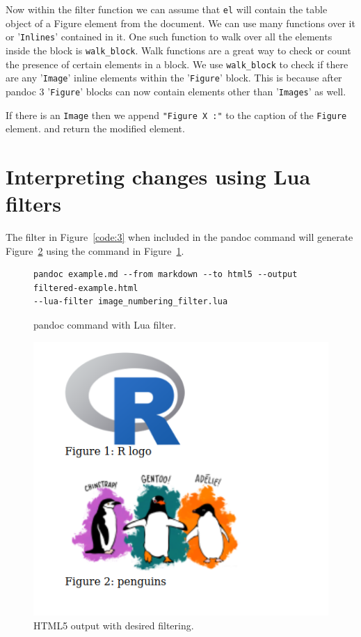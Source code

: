 Now within the filter function we can assume that \verb|el| will contain the table object of a Figure element from the document. We can use many functions over it or '\verb|Inlines|' contained in it. One such function to walk over all the elements inside the block is \verb|walk_block|. Walk functions are a great way to check or count the presence of certain elements in a block. We use \verb|walk_block| to check if there are any '\verb|Image|' inline elements within the '\verb|Figure|' block. This is because after pandoc 3 \citep{pandoc} '\verb|Figure|' blocks can now contain elements other than '\verb|Images|' as well.

If there is an \verb|Image| then we append \verb|"Figure X :"| to the caption of the \verb|Figure| element.
and return the modified element.

\section{Interpreting changes using Lua filters}

The filter in Figure~\ref{code:3} when included in the pandoc command will generate Figure~\ref{fig:2} 
using the command in Figure~\ref{code:4}.

\begin{figure}[htbp]
\begin{verbatim}
pandoc example.md --from markdown --to html5 --output filtered-example.html
--lua-filter image_numbering_filter.lua
\end{verbatim}
\caption{pandoc command with Lua filter.}
\label{code:4}
\end{figure}

\begin{figure}[htbp]
\centering
\includegraphics[width=0.5\linewidth]{figures/example-filtered.png}
\caption{HTML5 output with desired filtering.}
\label{fig:2}
\end{figure}

